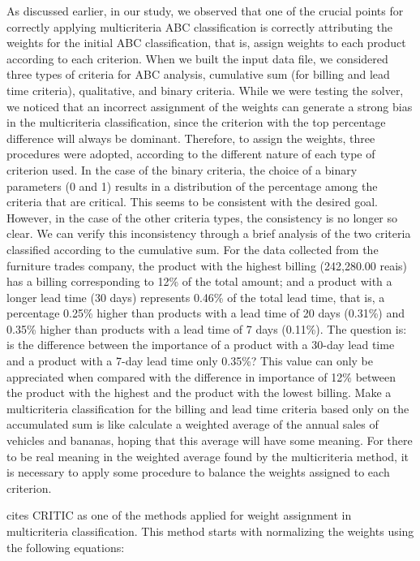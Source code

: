 \documentclass[10pt,fleqn,a4paper,twoside]{article}
\begin{document}
As discussed earlier, in our study, we observed that one of the crucial points for correctly applying multicriteria ABC classification is correctly attributing the weights for the initial ABC classification, that is, assign weights to each product according to each criterion. When we built the input data file, we considered three types of criteria for ABC analysis, cumulative sum (for billing and lead time criteria), qualitative, and binary criteria. While we were testing the solver, we noticed that an incorrect assignment of the weights can generate a strong bias in the multicriteria classification, since the criterion with the top percentage difference will always be dominant. Therefore, to assign the weights, three procedures were adopted, according to the different nature of each type of criterion used. In the case of the binary criteria, the choice of a binary parameters (0 and 1) results in a distribution of the percentage among the criteria that are critical. This seems to be consistent with the desired goal. However, in the case of the other criteria types, the consistency is no longer so clear.  We can verify this inconsistency through a brief analysis of the two criteria classified according to the cumulative sum. For the data collected from the furniture trades company, the product with the highest billing (242,280.00 reais) has a billing corresponding to 12\% of the total amount; and a product with a longer lead time (30 days) represents 0.46\% of the total lead time, that is, a percentage 0.25\% higher than products with a lead time of 20 days (0.31\%) and 0.35\% higher than products with a lead time of 7 days (0.11\%). The question is: is the difference between the importance of a product with a 30-day lead time and a product with a 7-day lead time only 0.35\%? This value can only be appreciated when compared with the difference in importance of 12\% between the product with the highest and the product with the lowest billing. Make a multicriteria classification for the billing and lead time criteria based only on the accumulated sum is like calculate a weighted average of the annual sales of vehicles and bananas, hoping that this average will have some meaning. For there to be real meaning in the weighted average found by the multicriteria method, it is necessary to apply some procedure to balance the weights assigned to each criterion.
	
	\citet{Odu2019} cites CRITIC as one of the methods applied for weight assignment in multicriteria classification. This method starts with normalizing the weights using the following equations:
	
\end{document}
